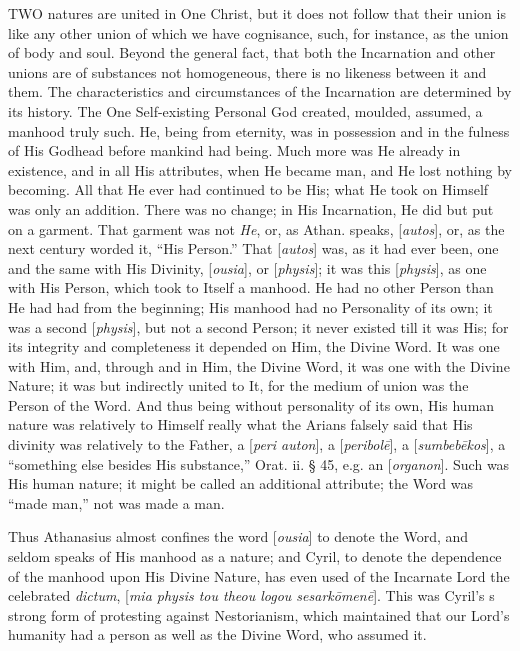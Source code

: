 TWO
natures are united in One Christ, but it does not follow that their
union is like any other union of which we have cognisance, such, for
instance, as the union of body and soul. Beyond the general fact, that
both the Incarnation and other unions are of substances not
homogeneous, there is no likeness between it and them. The
characteristics and circumstances of the Incarnation are determined by
its history. The One Self-existing Personal God created, moulded,
assumed, a manhood truly such. He, being from eternity, was in
possession and in the fulness of His Godhead before mankind had being.
Much more was He already in existence, and in all His attributes, when
He became man, and He lost nothing by becoming. All that He ever had
continued to be His; what He took on Himself was only an addition.
There was no change; in His Incarnation, He did but put on a garment.
That garment was not \emph{He}, or, as Athan. speaks, [\emph{autos}],
or, as the next century worded it, ``His Person.'' That [\emph{autos}]
was, as it had ever been, one and the same with His Divinity, [\emph{ousia}],
or [\emph{physis}]; it was this [\emph{physis}], as one with His
Person, which took to Itself a manhood. He had no other Person than He
had had from the beginning; His manhood had no Personality of its own;
it was a second [\emph{physis}], but not a second Person; it
never existed till it was His; for its integrity and completeness it
depended on Him, the Divine Word. It was one with Him, and, through
and in Him, the Divine Word, it was one with the Divine Nature; it was
but indirectly united to It, for the medium of union was the Person of
the Word. And thus being without personality of its own, His human
nature was relatively to Himself really what the Arians falsely said
that His divinity was relatively to the Father, a [\emph{peri auton}],
a [\emph{peribol\={e}}], a [\emph{sumbeb\={e}kos}], a ``something
else besides His substance,'' Orat. ii. § 45, e.g. an [\emph{organon}].
Such was His human nature; it might be called an additional attribute;
the Word was ``made man,'' not was made a man.

Thus Athanasius almost confines the word [\emph{ousia}]
to denote the Word, and seldom speaks of His manhood as a nature; and
Cyril, to denote the dependence of the manhood upon His Divine Nature,
has even used of the Incarnate Lord the celebrated \emph{dictum}, [\emph{mia
physis tou theou logou sesark\={o}men\={e}}]. This was
Cyril's s strong form of protesting against Nestorianism, which
maintained that our Lord's humanity had a person as well as the Divine
Word, who assumed it.

